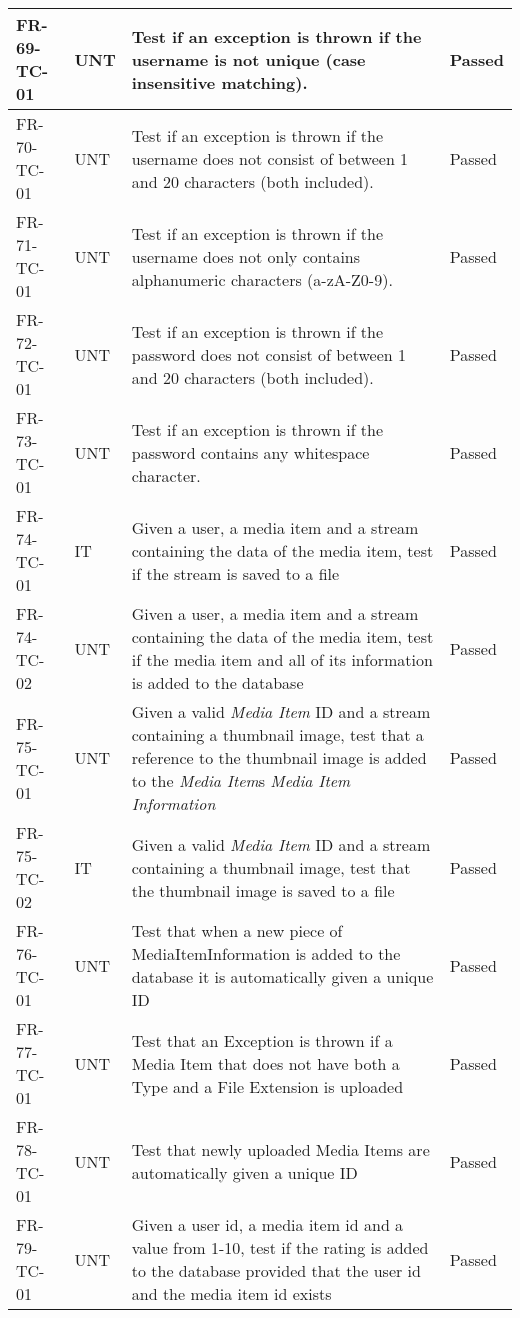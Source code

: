 \documentclass[../report.tex]{subfiles}
\begin{document}
\begin{longtable}{|L{2.1cm}|L{1cm}|L{12.4cm}|L{1.4cm}|}
FR-69-TC-01&UNT&Test if an exception is thrown if the username is not unique (case insensitive matching).&Passed  \\ \hline
FR-70-TC-01&UNT&Test if an exception is thrown if the username does not consist of between 1 and 20 characters (both included).&Passed  \\ \hline
FR-71-TC-01&UNT&Test if an exception is thrown if the username does not only contains alphanumeric characters (a-zA-Z0-9).&Passed  \\ \hline
FR-72-TC-01&UNT&Test if an exception is thrown if the password does not consist of between 1 and 20 characters (both included).&Passed  \\ \hline
FR-73-TC-01&UNT&Test if an exception is thrown if the password contains any whitespace character.&Passed  \\ \hline
FR-74-TC-01&IT&Given a user, a media item and a stream containing the data of the media item, test if the stream is saved to a file&Passed  \\ \hline
FR-74-TC-02&UNT&Given a user, a media item and a stream containing the data of the media item, test if the media item and all of its information is added to the database&Passed  \\ \hline
FR-75-TC-01 & UNT & Given a valid \textit{Media Item} ID and a stream containing a thumbnail image, test that a reference to the thumbnail image is added to the \textit{Media Item}s \textit{Media Item Information} & Passed  \\ \hline
FR-75-TC-02 & IT & Given a valid \textit{Media Item} ID and a stream containing a thumbnail image, test that the thumbnail image is saved to a file & Passed  \\ \hline
FR-76-TC-01&UNT&Test that when a new piece of MediaItemInformation is added to the database it is automatically given a unique ID&Passed  \\ \hline
FR-77-TC-01&UNT&Test that an Exception is thrown if a Media Item that does not have both a Type and a File Extension is uploaded&Passed  \\ \hline
FR-78-TC-01&UNT&Test that newly uploaded Media Items are automatically given a unique ID&Passed  \\ \hline
FR-79-TC-01&UNT&Given a user id, a media item id and a value from 1-10, test if the rating is added to the database provided that the user id and the media item id exists&Passed  \\ \hline

\end{longtable}
\end{document}
